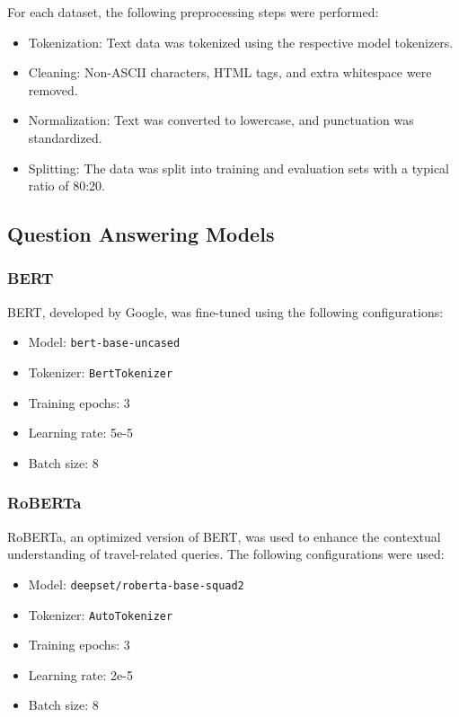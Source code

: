 \documentclass[conference]{IEEEtran}
\begin{document}
            For each dataset, the following preprocessing steps were performed:
            \begin{itemize}
                \item Tokenization: Text data was tokenized using the respective model tokenizers.
                \item Cleaning: Non-ASCII characters, HTML tags, and extra whitespace were removed.
                \item Normalization: Text was converted to lowercase, and punctuation was standardized.
                \item Splitting: The data was split into training and evaluation sets with a typical ratio of 80:20.
            \end{itemize}

    \subsection{Question Answering Models}

        \subsubsection{BERT}

            BERT, developed by Google, was fine-tuned using the following configurations:
            \begin{itemize}
                \item Model: \texttt{bert-base-uncased}
                \item Tokenizer: \texttt{BertTokenizer}
                \item Training epochs: 3
                \item Learning rate: 5e-5
                \item Batch size: 8
            \end{itemize}

        \subsubsection{RoBERTa}

            RoBERTa, an optimized version of BERT, was used to enhance the contextual understanding of travel-related queries. The following configurations were used:
            \begin{itemize}
                \item Model: \texttt{deepset/roberta-base-squad2}
                \item Tokenizer: \texttt{AutoTokenizer}
                \item Training epochs: 3
                \item Learning rate: 2e-5
                \item Batch size: 8
            \end{itemize}
\end{document}
